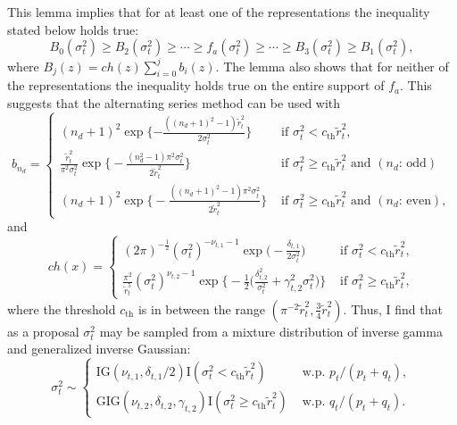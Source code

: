 \documentclass[11pt]{article}
\begin{document}
This lemma implies that for at least one of the representations the inequality stated below holds true: 
\[
B_0(\sigma^2_t) \ge B_2(\sigma^2_t) \ge \cdots \ge f_a(\sigma^2_t) \ge \cdots \ge B_3(\sigma^2_t) \ge B_1(\sigma^2_t),
\]
where $B_j(z) =ch(z)\sum_{i=0}^j b_i(z)$. 
The lemma also shows that for neither of the representations the inequality holds true on the entire support of $f_a$. 
This suggests that the alternating series method can be used with 
\begin{equation}
b_{n_d} = \begin{cases}
(n_d+1)^2 \exp\{-\frac{((n_d+1)^2-1)\widetilde{r}_t^2}{2\sigma_t^2}\}  & \text{ if } \sigma^2_t <c_{\mathrm{th}}\widetilde{r}_t^2, \\
\frac{\widetilde{r}_t^2}{\pi^2\sigma_t^{2}} 
\exp\bigg\{ -\frac{(n_d^2-1)\pi^2\sigma_t^2}{2\widetilde{r}_t^2} \bigg\} & \text{ if } \sigma^2_t \ge c_{\mathrm{th}}\widetilde{r}_t^2 \text{ and } (n_d\text{: odd}) \\
(n_d+1)^2 \exp\bigg\{ -\frac{((n_d+1)^2-1)\pi^2\sigma_t^2}{2\widetilde{r}_t^2} \bigg\} & \text{ if } \sigma^2_t \ge c_{\mathrm{th}}\widetilde{r}_t^2 \text{ and } (n_d\text{: even}), 
\end{cases}
\end{equation}
and 
\begin{equation}
ch(x)= \begin{cases}
(2\pi)^{-\frac{1}{2}} (\sigma^2_t)^{-\nu_{t,1}-1} \exp\Big(-\frac{\delta_{t,1}}{2\sigma^2_t} \Big)  & \text{ if } \sigma^2_t <c_{\mathrm{th}}\widetilde{r}_t^2, \\
\frac{\pi^2}{\widetilde{r}_t^5} (\sigma^2_t)^{\nu_{t,2}-1} \exp\bigg\{ -\frac{1}{2}\Big(\frac{\delta_{t,2}^2}{\sigma^2_t} +\gamma_{t, 2}^2\sigma^2_t \Big)\bigg\} & \text{ if } \sigma^2_t \ge c_{\mathrm{th}}\widetilde{r}_t^2, 
\end{cases}
\end{equation}
where the threshold $c_{\mathrm{th}}$ is in between the range $(\pi^{-2}\widetilde{r}_t^2, \frac{3}{4}\widetilde{r}_t^2)$. 
Thus, I find that as a proposal $\sigma^2_t$ may be sampled from a mixture distribution of inverse gamma and generalized inverse Gaussian:  
\begin{equation}
\sigma^2_t \sim \begin{cases}
\mathrm{IG}(\nu_{t,1}, \delta_{t,1}/2) \mathrm{I}(\sigma_t^2 < c_{\mathrm{th}}\widetilde{r}_t^2) & \text{ w.p. } p_t/(p_t+q_t), \\
\mathrm{GIG}(\nu_{t,2}, \delta_{t,2}, \gamma_{t,2}) \mathrm{I}(\sigma_t^2 \ge c_{\mathrm{th}}\widetilde{r}_t^2) & \text{ w.p. } q_t/(p_t+q_t). 
\end{cases}
\end{equation}
\end{document}
